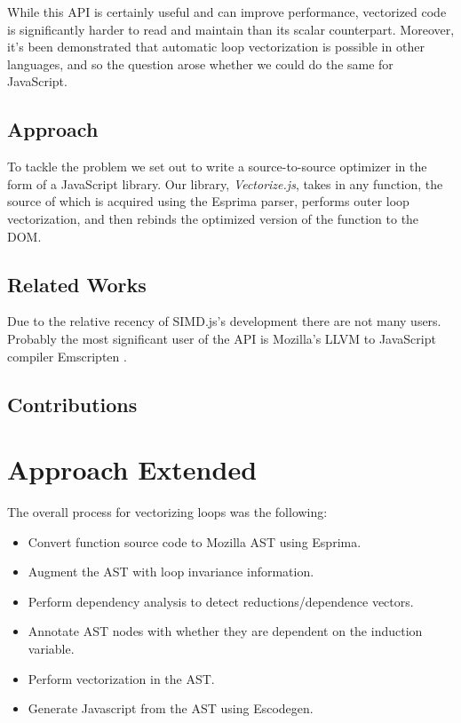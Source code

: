 \documentclass[conference]{IEEEtran}
\begin{document}
  While this API is certainly useful and can improve performance, vectorized
  code is significantly harder to read and maintain than its scalar counterpart.
  Moreover, it's been demonstrated that automatic loop vectorization is possible
  in other languages, and so the question arose whether we could do the same
  for JavaScript.

\subsection{Approach}

  To tackle the problem we set out to write a source-to-source optimizer in the
  form of a JavaScript library. Our library, \textit{Vectorize.js}, takes in
  any function, the source of which is acquired using the Esprima parser,
  performs outer loop vectorization, and then rebinds the optimized version of
  the function to the DOM.

\subsection{Related Works}

  Due to the relative recency of SIMD.js's development there are not many
  users. Probably the most significant user of the API is Mozilla's LLVM to
  JavaScript compiler Emscripten \cite{emscripten}.

\subsection{Contributions}

\section{Approach Extended}

The overall process for vectorizing loops was the following:
\begin{itemize}
    \item Convert function source code to Mozilla AST using Esprima\cite{esprima}.
\item Augment the AST with loop invariance information.
\item Perform dependency analysis to detect reductions/dependence vectors.
\item Annotate AST nodes with whether they are dependent on the induction variable.
\item Perform vectorization in the AST.
\item Generate Javascript from the AST using Escodegen\cite{escodegen}.
\end{itemize}
\end{document}
